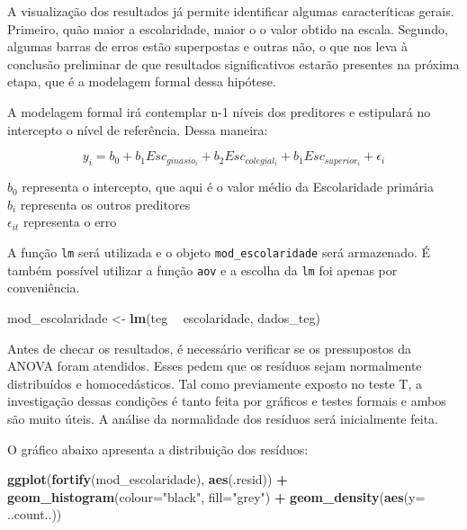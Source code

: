 \documentclass[
]{book}
\newenvironment{Shaded}{\begin{snugshade}}{\end{snugshade}}
\newcommand{\DataTypeTok}[1]{\textcolor[rgb]{0.13,0.29,0.53}{#1}}
\newcommand{\KeywordTok}[1]{\textcolor[rgb]{0.13,0.29,0.53}{\textbf{#1}}}
\newcommand{\NormalTok}[1]{#1}
\newcommand{\OperatorTok}[1]{\textcolor[rgb]{0.81,0.36,0.00}{\textbf{#1}}}
\newcommand{\StringTok}[1]{\textcolor[rgb]{0.31,0.60,0.02}{#1}}
\begin{document}
A visualização dos resultados já permite identificar algumas caracteríticas gerais. Primeiro, quão maior a escolaridade, maior o o valor obtido na escala. Segundo, algumas barras de erros estão superpostas e outras não, o que nos leva à conclusão preliminar de que resultados significativos estarão presentes na próxima etapa, que é a modelagem formal dessa hipótese.

A modelagem formal irá contemplar n-1 níveis dos preditores e estipulará no intercepto o nível de referência. Dessa maneira:

\[y_{i} = b_{0} + b_1Esc_{ginasio_i} + b_2Esc_{colegial_i} + b_1Esc_{superior_i} + \epsilon_{i}\]

\(b_0\) representa o intercepto, que aqui é o valor médio da Escolaridade primária\\
\(b_i\) representa os outros preditores\\
\(\epsilon_{it}\) representa o erro

A função \texttt{lm} será utilizada e o objeto \texttt{mod\_escolaridade} será armazenado. É também possível utilizar a função \texttt{aov} e a escolha da \texttt{lm} foi apenas por conveniência.

\begin{Shaded}
\begin{Highlighting}[]
\NormalTok{mod_escolaridade <-}\StringTok{ }\KeywordTok{lm}\NormalTok{(teg }\OperatorTok{~}\StringTok{ }\NormalTok{escolaridade, dados_teg)}
\end{Highlighting}
\end{Shaded}

Antes de checar os resultados, é necessário verificar se os pressupostos da ANOVA foram atendidos. Esses pedem que os resíduos sejam normalmente distribuídos e homocedásticos. Tal como previamente exposto no teste T, a investigação dessas condições é tanto feita por gráficos e testes formais e ambos são muito úteis. A análise da normalidade dos resíduos será inicialmente feita.

O gráfico abaixo apresenta a distribuição dos resíduos:

\begin{Shaded}
\begin{Highlighting}[]
\KeywordTok{ggplot}\NormalTok{(}\KeywordTok{fortify}\NormalTok{(mod_escolaridade), }\KeywordTok{aes}\NormalTok{(.resid)) }\OperatorTok{+}
\StringTok{      }\KeywordTok{geom_histogram}\NormalTok{(}\DataTypeTok{colour=}\StringTok{"black"}\NormalTok{, }\DataTypeTok{fill=}\StringTok{"grey"}\NormalTok{) }\OperatorTok{+}
\StringTok{      }\KeywordTok{geom_density}\NormalTok{(}\KeywordTok{aes}\NormalTok{(}\DataTypeTok{y=}\NormalTok{ ..count..))}
\end{Highlighting}
\end{Shaded}
\end{document}
